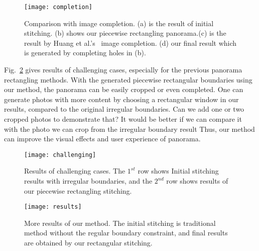 \documentclass[10pt,journal,compsoc]{IEEEtran}
\newcommand{\zfl}[1]{{\color{red}#1}}
\begin{document}
 \begin{figure} %
  \centering
  \texttt{[image: completion]}
  \caption{Comparison with image completion. (a) is the result of initial stitching. (b) shows our piecewise rectangling panorama.(c) is the result by Huang et al.'s~\cite{journals/tog/HuangKAK14} image completion. (d) our final result which is generated by completing holes in (b). } \label{fig:completion}
\end{figure}

\begin{comment}
 \begin{figure} %
  \centering
  \texttt{[image: crop]}
  \caption{Content-ware cropping. (a) Chen et al.'s~\cite{conf/eccv/ChenC16} stitching with global prior. (b) He et al.'s~\cite{journals/tog/HeC013} rectangular stitching result.
  (c) Our piecewise rectangular stitching result.} \label{fig:crop}
\end{figure}
\end{comment}

Fig.~\ref{fig:challenging_cases} gives results of challenging cases, especially for the previous panorama rectangling methods. With the generated piecewise rectangular boundaries using our method, the panorama can be easily cropped or even completed. One can generate photos with more content by choosing a rectangular window in our results, compared to the original irregular boundaries. \zfl{Can we add one or two cropped photos to demonstrate that? It would be better if we can compare it with the photo we can crop from the irregular boundary result} Thus, our method can improve the visual effects and user experience of panorama.

 \begin{figure} %
  \centering
  \texttt{[image: challenging]}
  \caption{Results of challenging cases. The $1^{st}$ row shows Initial stitching results with irregular boundaries, and the $2^{nd}$ row shows results of our piecewise rectangling stitching.} \label{fig:challenging_cases}
\end{figure}

 \begin{figure*} %
  \centering
  \texttt{[image: results]}
  \caption{More results of our method. The initial stitching is traditional method without the regular boundary constraint, and final results are obtained by our rectangular stitching.} \label{fig:more_results}
\end{figure*}
\end{document}
